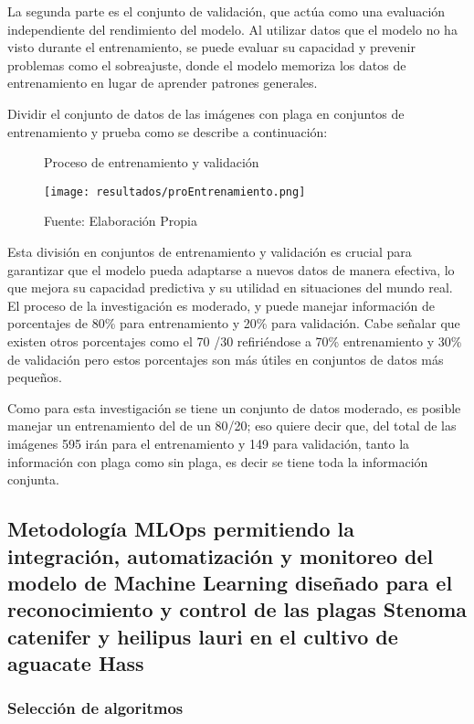 La segunda parte es el conjunto de validación, que actúa como una evaluación independiente del rendimiento del modelo. Al utilizar datos que el modelo no ha visto durante el entrenamiento, se puede evaluar su capacidad y prevenir problemas como el sobreajuste, donde el modelo memoriza los datos de entrenamiento en lugar de aprender patrones generales.

Dividir el conjunto de datos de las imágenes con plaga en conjuntos de entrenamiento y prueba como se describe a continuación:

\newpage

\begin{figure}[h]
\centering
\caption{Proceso de entrenamiento y validación}
\texttt{[image: resultados/proEntrenamiento.png]}
\caption*{\footnotesize Fuente: Elaboración Propia}
\label{fig:figuraProEntrenamiento}
\end{figure}

Esta división en conjuntos de entrenamiento y validación es crucial para garantizar que el modelo pueda adaptarse a nuevos datos de manera efectiva, lo que mejora su capacidad predictiva y su utilidad en situaciones del mundo real. El proceso de la investigación es moderado, y puede manejar información de porcentajes de 80\% para entrenamiento y 20\% para validación. Cabe señalar que existen otros porcentajes como el 70 /30 refiriéndose a 70\% entrenamiento y 30\% de validación pero estos porcentajes son más útiles en conjuntos de datos más pequeños. 

Como para esta investigación se tiene un conjunto de datos moderado, es posible manejar un entrenamiento del de un 80/20; eso quiere decir que, del total de las imágenes 595 irán para el entrenamiento y 149 para validación, tanto la información con plaga como sin plaga, es decir se tiene toda la información conjunta.

\subsection{Metodología MLOps permitiendo la integración, automatización y monitoreo del modelo de Machine Learning diseñado para el reconocimiento y control de las plagas Stenoma catenifer y heilipus lauri en el cultivo de aguacate Hass}

\subsubsection{Selección de algoritmos}

